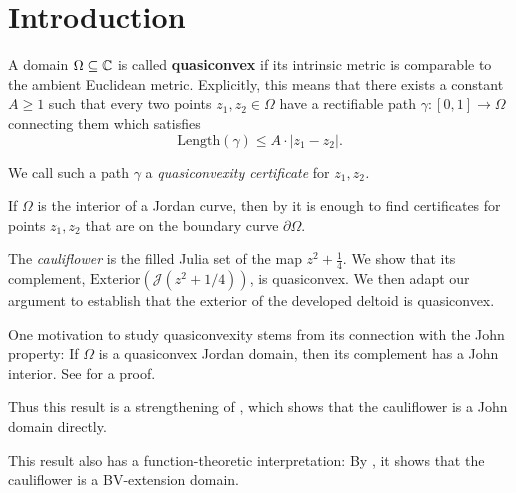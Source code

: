 


\section{Introduction}
A domain $\Omega\subseteq\mathbb{C}$ is called \textbf{quasiconvex }if its
intrinsic metric is comparable to the ambient Euclidean metric. Explicitly,
this means that there exists a constant $A\geq1$ such that every
two points $z_{1},z_{2}\in\Omega$ have a rectifiable path $\gamma:\left[0,1\right]\to\Omega$
connecting them which satisfies %
\[
\mathrm{Length}(\gamma)\leq A\cdot\left|z_{1}-z_{2}\right|.
\]

We call such a path $\gamma$ a \emph{quasiconvexity certificate }for\emph{
$z_{1},z_{2}$.}%
\begin{comment}
The space $X$ is called \textbf{quasiconvex }if there is a constant
$C$ such that every pair of points $z_{1},z_{2}\in X$ can be connected
by a $C$-quasiconvex path. In other words, the intrinsic metric on
$X$ is comparable to the ambient Euclidean metric. 
\end{comment}

If $\Omega$ is the interior of a Jordan curve, then by \cite[Corollary F]{euclidean-quasiconvexity}
it is enough to find certificates for points $z_{1},z_{2}$ that are
on the boundary curve $\partial\Omega$.%
\begin{comment}
It is also shown in \cite{euclidean-quasiconvexity} that any quasidisk is quasiconvex.
\end{comment}

The \emph{cauliflower} is the filled Julia set of the map $z^2+\frac 14$.
We show that its complement, $\mathrm{Exterior}(\mathcal{J}(z^{2}+1/4))$,
is quasiconvex. We then adapt our argument to establish that the exterior of the developed deltoid is quasiconvex.



One motivation to study quasiconvexity stems from its connection with the
John property: If $\Omega$ is a quasiconvex Jordan domain, then its complement has a John interior. See \cite[Corollary 3.4]{euclidean-quasiconvexity} for a proof.

Thus this result is a strengthening of \cite[Theorem 6.1]{julia-and-john}, which shows that the cauliflower is a John domain directly.

This result also has a function-theoretic interpretation: By \cite[Theorem 1.1]{BV-extension}, it shows that the cauliflower is a BV-extension domain.

